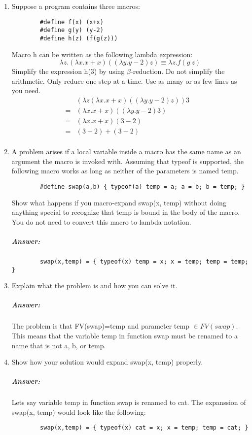 \documentclass{article}
\begin{document}
\begin{enumerate}[label=\textbf{\arabic*}.]
	\item Suppose a program contains three macros:
		\begin{lstlisting}
		#define f(x) (x+x)
		#define g(y) (y-2)
		#define h(z) (f(g(z)))
		\end{lstlisting}
		Macro h can be written as the following lambda expression:
	$$\lambda z.(\lambda x.x+x)((\lambda y.y-2) z) \equiv \lambda z.f(g\ z)$$
	Simplify the expression h(3) by using $\beta$-reduction. Do not simplify the
	arithmetic. Only reduce one step at a time. Use as many or as few lines as you need.
	\begin{align*}
		&(\lambda z(\lambda x.x + x)((\lambda y.y - 2)z))3&\\
		=&(\lambda x.x+x)((\lambda y.y-2)3)&\\
		=&(\lambda x.x+x)(3-2)&\\
		=&(3-2)+(3-2)&\\
	\end{align*}

	\item A problem arises if a local variable inside a macro has the same name as
		an argument the macro is
		invoked with. Assuming that typeof is supported, the following macro works
		as long as neither of the
		parameters is named temp.
		\begin{lstlisting}
		#define swap(a,b) { typeof(a) temp = a; a = b; b = temp; }
		\end{lstlisting}
		Show what happens if you macro-expand swap(x, temp) without doing anything
		special to recognize
		that temp is bound in the body of the macro. You do not need to convert this
		macro to lambda notation.

		\subparagraph{Answer: } 
		\begin{lstlisting}
		swap(x,temp) = { typeof(x) temp = x; x = temp; temp = temp; }
		\end{lstlisting}

	\item Explain what the problem is and how you can solve it.
		\subparagraph{Answer: } The problem is that FV(swap)={temp} and parameter
		temp $\in FV(swap)$. This means that the variable temp in function swap
		must be renamed to a name that is not a, b, or temp.

	\item Show how your solution would expand swap(x, temp) properly.
		\subparagraph{Answer: } Lets say variable temp in function swap is renamed
		to cat. The expanssion of swap(x, temp) would look like the following:
		\begin{lstlisting}
		swap(x,temp) = { typeof(x) cat = x; x = temp; temp = cat; }
		\end{lstlisting}

\end{enumerate}
\end{document}
